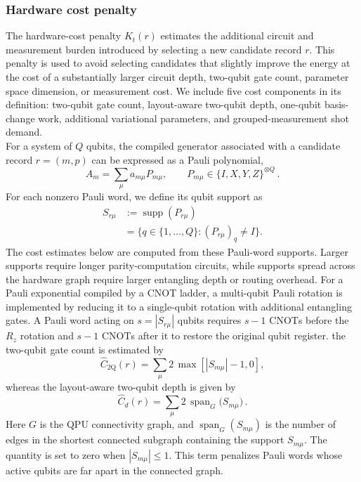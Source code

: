 \documentclass[
  reprint,
  amsmath,
  amssymb,
  aps,
  pra,
  nofootinbib,
  superscriptaddress,
  floatfix
]{revtex4-2}
\newcommand{\twq}{\mathrm{2Q}}
\begin{document}
\subsubsection{Hardware cost penalty}
%
\noindent
The hardware-cost penalty \(K_t(r)\) estimates the additional circuit and measurement burden introduced by selecting a new candidate record \(r\). This penalty is used to avoid selecting candidates that slightly improve the energy at the cost of a substantially larger circuit depth, two-qubit gate count, parameter space dimension, or measurement cost. We include five cost components in its definition: two-qubit gate count, layout-aware two-qubit depth, one-qubit basis-change work, additional variational parameters, and grouped-measurement shot demand.\\
\noindent
For a system of \(Q\) qubits, the compiled generator associated with a candidate record \(r=(m,p)\) can be expressed as a Pauli polynomial, 
\[
A_m=\sum_{\mu}a_{m\mu}P_{m\mu}, \qquad P_{m\mu}\in\{I,X,Y,Z\}^{\otimes Q}\,.
\]
%
For each nonzero Pauli word, we define its qubit support as
%
\begin{equation}
\begin{aligned}
S_{r\mu}
&:=\operatorname{supp}(P_{r\mu}) \\
&=\{q\in\{1,\ldots,Q\}:(P_{r\mu})_q\ne I\}.
\end{aligned}
\label{eq:pauli_word_support}
\end{equation}
%
The cost estimates below are computed from these Pauli-word supports. Larger supports require longer parity-computation circuits, while supports spread across the hardware graph require larger entangling depth or routing overhead. For a Pauli exponential compiled by a CNOT ladder, a multi-qubit Pauli rotation is implemented by reducing it to a single-qubit rotation with additional entangling gates. A Pauli word acting on \(s=|S_{r\mu}|\) qubits requires \(s-1\) \textsc{CNOT}s before the \(R_z\) rotation and \(s-1\) \textsc{CNOT}s after it to restore the original qubit register. the two-qubit gate count is estimated by
%
\begin{equation}
\widehat C_{\twq}(r)=\sum_{\mu}2\,\max[|S_{m\mu}|-1, 0],
\label{eq:pauli_2count_proxy}
\end{equation}
whereas the layout-aware two-qubit depth is given by
\begin{equation}
\widehat C_d(r)=\sum_{\mu}2\,\operatorname{span}_{G}
\bigl(S_{m\mu}\bigr)\,.
\label{eq:pauli_2depth_proxy}
\end{equation}
Here \(G\) is the QPU connectivity graph, and $\operatorname{span}_{G}(S_{m \mu})$ is the number of edges in the shortest connected subgraph containing the support \(S_{m \mu}\). The quantity is set to zero when $|S_{m \mu}|\le1$. This term penalizes Pauli words whose active qubits are far apart in the connected graph.\\
\end{document}
